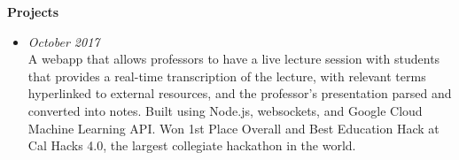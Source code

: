 \documentclass[letterpaper,8pt]{article}
\begin{document}
{%

\textbf{\large{Projects}}
\begin{itemize}

\item{\small{\textbf{\href{https://devpost.com/software/megafind}{}}}}\hfill{\textit{October 2017}} \\
    \small{A webapp that allows professors to have a live lecture session with students that provides a real-time transcription of the lecture, with relevant terms hyperlinked to external resources, and the professor's presentation parsed and converted into notes. Built using Node.js, websockets, and Google Cloud Machine Learning API. Won 1st Place Overall and Best Education Hack at Cal Hacks 4.0, the largest collegiate hackathon in the world.}






\end{itemize}}
\end{document}
